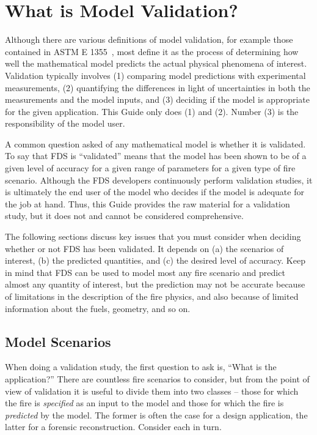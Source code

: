 
\chapter{What is Model Validation?}

Although there are various definitions of model validation, for example those contained in
ASTM E 1355~\cite{ASTM:E1355}, most define it as the process of determining how well the mathematical model predicts the actual physical phenomena of
interest.
Validation typically involves (1) comparing model predictions with experimental measurements, (2) quantifying the differences in light of uncertainties in
both the measurements and the model inputs, and (3) deciding if the model is appropriate for the given application. This Guide only does (1) and (2). Number (3) is
the responsibility of the model user.

A common question asked of any mathematical model is whether it is validated. To say that FDS is
``validated'' means that the model has been shown to be of a given level of accuracy for a given range of parameters for a given
type of fire scenario. Although the FDS developers continuously perform validation studies, it is ultimately the end user of the model who
decides if the model is adequate for the job at hand. Thus, this Guide provides the raw material for a validation study, but it does not
and cannot be considered comprehensive.

The following sections discuss key issues that you must consider when deciding whether or not FDS has been validated. It depends on (a) the scenarios
of interest, (b) the predicted quantities, and (c) the desired level of accuracy. Keep in mind that FDS can be used to model most any fire scenario and predict almost
any quantity of interest, but the prediction may not be accurate because of limitations in the description of the fire physics, and also because of limited
information about the fuels, geometry, and so on.



\section{Model Scenarios}

When doing a validation study, the first question to ask is, ``What is the application?'' There are countless fire scenarios to consider, but from the
point of view of validation it is useful to divide them into two classes -- those for which the fire is {\em specified} as an input to the model and those for which the fire
is {\em predicted} by the model. The former is often the case for a design application, the latter for a forensic reconstruction. Consider each in turn.

